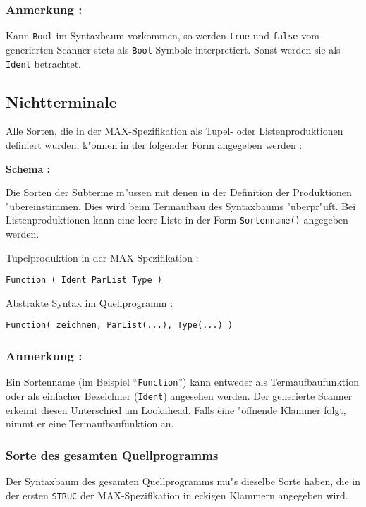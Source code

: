 \subsubsection*{Anmerkung :}

Kann {\tt Bool} im Syntaxbaum vorkommen, so werden {\tt true}
und {\tt false} vom generierten Scanner stets als {\tt Bool}-Symbole
interpretiert. Sonst werden sie als {\tt Ident} betrachtet.


\subsection{Nichtterminale}

Alle Sorten, die in der MAX-Spezifikation als Tupel- oder Listenproduktionen
definiert wurden, k"onnen in der folgender Form angegeben werden :

\medskip\noindent
{\bf Schema :} 

\medskip\noindent
Die Sorten der Subterme m"ussen mit denen in der Definition der Produktionen
"ubereinstimmen. Dies wird beim Termaufbau des Syntaxbaums "uberpr"uft.
Bei Listenproduktionen kann eine leere Liste in der Form
{\tt Sortenname()} angegeben werden.

\medskip{}

\medskip\noindent Tupelproduktion in der MAX-Spezifikation :

{\tt Function ( Ident ParList Type )}

\medskip\noindent Abstrakte Syntax im Quellprogramm :

{\tt Function( zeichnen, ParList(...), Type(...) )}

\subsubsection*{Anmerkung :}

Ein Sortenname (im Beispiel "`{\tt Function}"') kann entweder als
Termaufbaufunktion oder als einfacher Bezeichner ({\tt Ident})
angesehen werden. Der generierte Scanner erkennt diesen Unterschied am
Lookahead. Falls eine "offnende Klammer folgt, nimmt er eine
Termaufbaufunktion an.

\subsubsection*{Sorte des gesamten Quellprogramms}

Der Syntaxbaum des gesamten Quellprogramms mu"s dieselbe Sorte
haben, die in der ersten {\tt STRUC} der MAX-Spezifikation
in eckigen Klammern angegeben wird.



